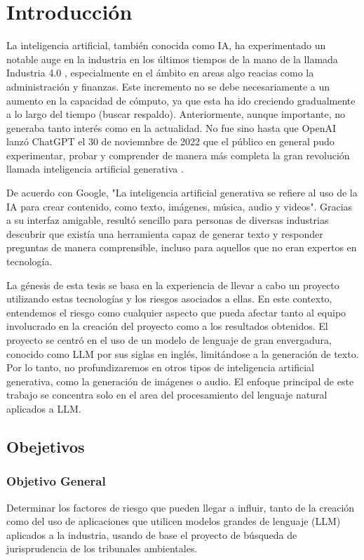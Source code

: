 
\chapter{Introducción}
La inteligencia artificial, también conocida como IA, ha experimentado un notable auge en la industria en los últimos tiempos
de la mano de la llamada Industria 4.0 \cite{intro1}, 
especialmente en el ámbito en areas algo reacias como la administración y finanzas\cite{intro2}. 
Este incremento no se debe necesariamente a un aumento en la capacidad de cómputo, 
ya que esta ha ido creciendo gradualmente a lo largo del tiempo (buscar respaldo). Anteriormente, aunque importante, no generaba tanto 
interés como en la actualidad. No fue sino hasta que OpenAI lanzó ChatGPT el 30 de noviemnbre de 2022 que el público en general 
pudo experimentar, 
probar y comprender de manera más completa la gran revolución llamada inteligencia artificial generativa \cite{intro3}.

De acuerdo con Google, "La inteligencia artificial generativa se refiere al uso de la IA para crear contenido, como texto, imágenes, 
música, audio y videos"\cite{google1}. Gracias a su interfaz amigable, resultó sencillo para personas de diversas industrias descubrir que existía 
una herramienta capaz de generar texto y responder preguntas de manera comprensible, incluso para aquellos que no eran expertos en 
tecnología.

La génesis de esta tesis se basa en la experiencia de llevar a cabo un proyecto utilizando estas tecnologías 
y los riesgos asociados a ellas. En este contexto, entendemos el riesgo como cualquier aspecto que pueda afectar 
tanto al equipo involucrado en la creación del proyecto como a los resultados obtenidos. El proyecto se centró 
en el uso de un modelo de lenguaje de gran envergadura, conocido como LLM por sus siglas en inglés, limitándose a la 
generación de texto. Por lo tanto, no profundizaremos en otros tipos de inteligencia artificial generativa, como la 
generación de imágenes o audio. El enfoque principal de este trabajo se concentra solo
en el area del procesamiento del lenguaje natural aplicados a LLM.

\newpage

\section{Obejetivos}
\subsection{Objetivo General}
Determinar los factores de riesgo que pueden llegar a influir, tanto de la creación como del uso de aplicaciones que utilicen modelos grandes de lenguaje (LLM) aplicados a la industria, usando de base el proyecto de búsqueda de jurisprudencia de los tribunales ambientales. 
